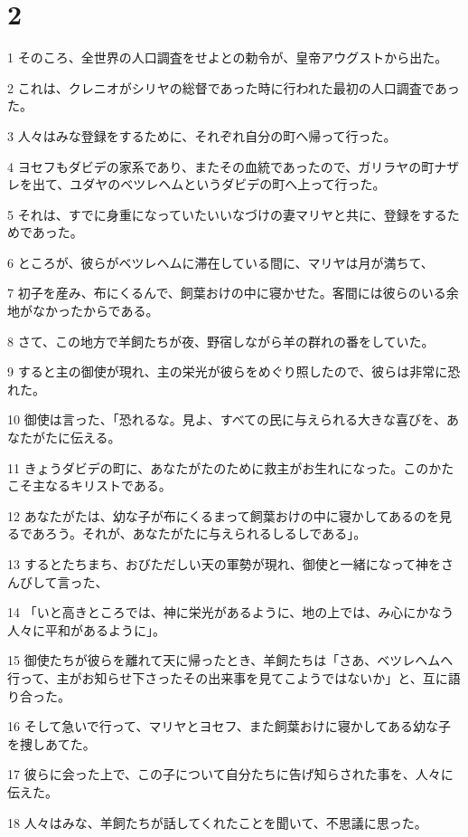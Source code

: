 \chapter{2}

\par 1 そのころ、全世界の人口調査をせよとの勅令が、皇帝アウグストから出た。
\par 2 これは、クレニオがシリヤの総督であった時に行われた最初の人口調査であった。
\par 3 人々はみな登録をするために、それぞれ自分の町へ帰って行った。
\par 4 ヨセフもダビデの家系であり、またその血統であったので、ガリラヤの町ナザレを出て、ユダヤのベツレヘムというダビデの町へ上って行った。
\par 5 それは、すでに身重になっていたいいなづけの妻マリヤと共に、登録をするためであった。
\par 6 ところが、彼らがベツレヘムに滞在している間に、マリヤは月が満ちて、
\par 7 初子を産み、布にくるんで、飼葉おけの中に寝かせた。客間には彼らのいる余地がなかったからである。
\par 8 さて、この地方で羊飼たちが夜、野宿しながら羊の群れの番をしていた。
\par 9 すると主の御使が現れ、主の栄光が彼らをめぐり照したので、彼らは非常に恐れた。
\par 10 御使は言った、「恐れるな。見よ、すべての民に与えられる大きな喜びを、あなたがたに伝える。
\par 11 きょうダビデの町に、あなたがたのために救主がお生れになった。このかたこそ主なるキリストである。
\par 12 あなたがたは、幼な子が布にくるまって飼葉おけの中に寝かしてあるのを見るであろう。それが、あなたがたに与えられるしるしである」。
\par 13 するとたちまち、おびただしい天の軍勢が現れ、御使と一緒になって神をさんびして言った、
\par 14 「いと高きところでは、神に栄光があるように、地の上では、み心にかなう人々に平和があるように」。
\par 15 御使たちが彼らを離れて天に帰ったとき、羊飼たちは「さあ、ベツレヘムへ行って、主がお知らせ下さったその出来事を見てこようではないか」と、互に語り合った。
\par 16 そして急いで行って、マリヤとヨセフ、また飼葉おけに寝かしてある幼な子を捜しあてた。
\par 17 彼らに会った上で、この子について自分たちに告げ知らされた事を、人々に伝えた。
\par 18 人々はみな、羊飼たちが話してくれたことを聞いて、不思議に思った。
